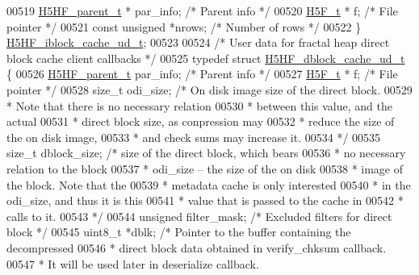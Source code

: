 \begin{DoxyCode}
00519     \hyperlink{struct_h5_h_f__parent__t}{H5HF\_parent\_t} * par\_info;   \textcolor{comment}{/* Parent info */}
00520     \hyperlink{struct_h5_f__t}{H5F\_t} * f;                  \textcolor{comment}{/* File pointer */}
00521     \textcolor{keyword}{const} \textcolor{keywordtype}{unsigned} *nrows;      \textcolor{comment}{/* Number of rows */}
00522 \} \hyperlink{struct_h5_h_f__iblock__cache__ud__t}{H5HF\_iblock\_cache\_ud\_t};
00523 
00524 \textcolor{comment}{/* User data for fractal heap direct block cache client callbacks */}
00525 \textcolor{keyword}{typedef} \textcolor{keyword}{struct }\hyperlink{struct_h5_h_f__dblock__cache__ud__t}{H5HF\_dblock\_cache\_ud\_t} \{
00526     \hyperlink{struct_h5_h_f__parent__t}{H5HF\_parent\_t} par\_info;     \textcolor{comment}{/* Parent info */}
00527     \hyperlink{struct_h5_f__t}{H5F\_t} * f;                  \textcolor{comment}{/* File pointer */}
00528     \textcolor{keywordtype}{size\_t} odi\_size;        \textcolor{comment}{/* On disk image size of the direct block.}
00529 \textcolor{comment}{                 * Note that there is no necessary relation}
00530 \textcolor{comment}{                 * between this value, and the actual}
00531 \textcolor{comment}{                 * direct block size, as conpression may}
00532 \textcolor{comment}{                 * reduce the size of the on disk image,}
00533 \textcolor{comment}{                 * and check sums may increase it.}
00534 \textcolor{comment}{                 */}
00535     \textcolor{keywordtype}{size\_t} dblock\_size;     \textcolor{comment}{/* size of the direct block, which bears}
00536 \textcolor{comment}{                 * no necessary relation to the block}
00537 \textcolor{comment}{                 * odi\_size -- the size of the on disk}
00538 \textcolor{comment}{                 * image of the block.  Note that the}
00539 \textcolor{comment}{                 * metadata cache is only interested}
00540 \textcolor{comment}{                 * in the odi\_size, and thus it is this}
00541 \textcolor{comment}{                 * value that is passed to the cache in}
00542 \textcolor{comment}{                 * calls to it.}
00543 \textcolor{comment}{                 */}
00544     \textcolor{keywordtype}{unsigned} filter\_mask;   \textcolor{comment}{/* Excluded filters for direct block */}
00545     uint8\_t *dblk;  \textcolor{comment}{/* Pointer to the buffer containing the decompressed}
00546 \textcolor{comment}{                     * direct block data obtained in verify\_chksum callback.}
00547 \textcolor{comment}{                     * It will be used later in deserialize callback.}

\end{DoxyCode}
